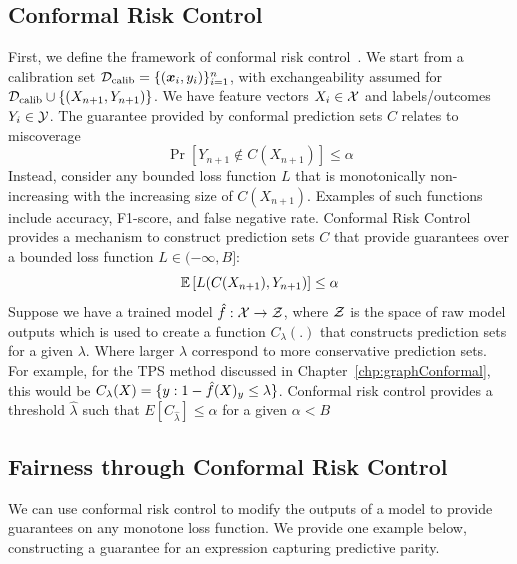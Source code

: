 \subsection{Conformal Risk Control}

First, we define the framework of conformal risk control~\citep{angelopoulos2024conformal}.
We start from a calibration set ${\mathcal{D}}_{\text{calib}} = \{({\bm{x}}_i, y_i)\}_{i=1}^n$,
with exchangeability assumed for ${\mathcal{D}}_{\text{calib}} \cup \{(X_{n+1}, Y_{n+1})\}$.
We have feature vectors $X_i \in {\mathcal{X}}$ and labels/outcomes $Y_i \in {\mathcal{Y}}$. %
The guarantee provided by conformal prediction sets $C$ relates to miscoverage
\[
        \Pr\left[Y_{n+1} \not\in C(X_{n+1})\right] \leq \alpha
\]
Instead, consider any bounded loss function $L$ that is monotonically non-increasing with the increasing size of $C(X_{n+1})$.
Examples of such functions include accuracy, F1-score, and false negative rate.
Conformal Risk Control provides a mechanism to construct prediction sets $C$ that provide guarantees over a bounded loss function $L \in (-\infty, B]$:
\[
    \mathbb{E}\left[L(C(X_{n+1}), Y_{n+1})\right] \leq \alpha
\]
Suppose we have a trained model $\hat{f}: {\mathcal{X}} \rightarrow {\mathcal{Z}}$, where ${\mathcal{Z}}$ is the space of raw model outputs which is used to create a function $C_\lambda(.)$ that constructs prediction sets for a given $\lambda$.
Where larger $\lambda$ correspond to more conservative prediction sets.
For example, for the TPS method discussed in Chapter~\ref{chp:graphConformal}, this would be $C_\lambda(X) = \{y: 1 - \hat{f}(X)_y \leq \lambda\}$.
Conformal risk control provides a threshold $\hat{\lambda}$ such that $E[C_{\hat{\lambda}}] \leq \alpha$ for a given $\alpha < B$

\subsection{Fairness through Conformal Risk Control}
We can use conformal risk control to modify the outputs of a model to provide guarantees on any monotone loss function.
We provide one example below, constructing a guarantee for an expression capturing predictive parity. 

